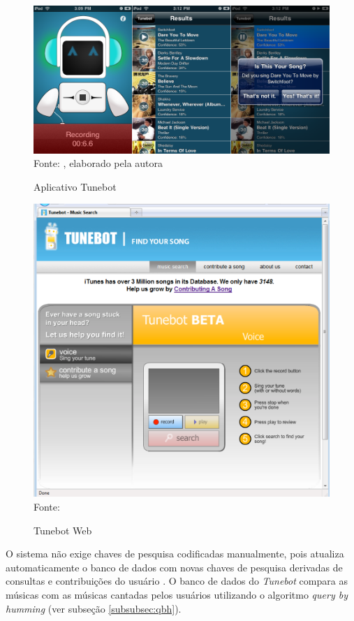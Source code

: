 \begin{figure}[!htb]
   \centering
   \caption{Aplicativo Tunebot}\label{fig:tunebotIphone} 
   \includegraphics[scale=0.35]{figuras/tunebot-iphone.png}
   \\Fonte: \cite{tunebotiOS}, elaborado pela autora
\end{figure}

\begin{figure}[!htb]
   \centering
   \caption{Tunebot Web}\label{fig:tunebotWeb} 
   \includegraphics[scale=0.50]{figuras/tunebotWeb.png}
   \\Fonte: \cite{pardo2010}
\end{figure}

O sistema não exige chaves de pesquisa codificadas manualmente, pois atualiza automaticamente o banco de dados com novas chaves de pesquisa derivadas de consultas e contribuições do usuário \cite{pardo2010}. O banco de dados do \textit{Tunebot} compara as músicas com as músicas cantadas pelos usuários utilizando o algoritmo \textit{query by humming} (ver subseção \ref{subsubsec:qbh}).


